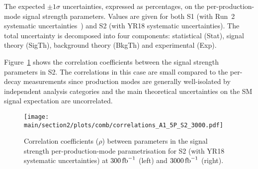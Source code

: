 \begin{table}[hbtp]
\centering
\caption{The expected $\pm 1\sigma$ uncertainties, expressed as percentages, on the per-production-mode signal strength parameters. Values are given for both S1 (with Run~2 systematic uncertainties~\cite{Sirunyan:2018koj}) and S2 (with YR18 systematic uncertainties). The total uncertainty is decomposed into four components: statistical (Stat), signal theory (SigTh), background theory (BkgTh) and experimental (Exp).}

\label{tab:summary_A1_5P}
\vspace{0.5cm}
\end{table}

Figure~\ref{fig:corr_A1_5P} shows the correlation coefficients between the signal strength parameters in S2. The correlations in this case are small compared to the per-decay measurements since production modes are generally well-isolated by independent analysis categories and the main theoretical uncertainties on the SM signal expectation are uncorrelated.

\begin{figure}[hbtp]
\centering
\texttt{[image: \\main/section2/plots/comb/correlations\_A1\_5P\_S2\_3000.pdf]}%
\caption{Correlation coefficients ($\rho$) between parameters in the signal strength per-production-mode parametrisation for S2 (with YR18 systematic uncertainties) at $300\mbox{\ensuremath{\,\text{fb}^\text{$-$1}}}$ (left) and $3000\mbox{\ensuremath{\,\text{fb}^\text{$-$1}}}$ (right).}
\label{fig:corr_A1_5P}
\end{figure}
